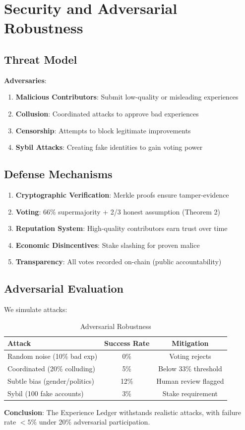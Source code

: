 \section{Security and Adversarial Robustness}


\subsection{Threat Model}

\textbf{Adversaries}:
\begin{enumerate}
    \item \textbf{Malicious Contributors}: Submit low-quality or misleading experiences
    \item \textbf{Collusion}: Coordinated attacks to approve bad experiences
    \item \textbf{Censorship}: Attempts to block legitimate improvements
    \item \textbf{Sybil Attacks}: Creating fake identities to gain voting power
\end{enumerate}

\subsection{Defense Mechanisms}

\begin{enumerate}
    \item \textbf{Cryptographic Verification}: Merkle proofs ensure tamper-evidence
    \item \textbf{\DAO{} Voting}: 66\% supermajority + 2/3 honest assumption (Theorem 2)
    \item \textbf{Reputation System}: High-quality contributors earn trust over time
    \item \textbf{Economic Disincentives}: Stake slashing for proven malice
    \item \textbf{Transparency}: All votes recorded on-chain (public accountability)
\end{enumerate}

\subsection{Adversarial Evaluation}

We simulate attacks:

\begin{table}[t]
\centering
\caption{Adversarial Robustness}
\label{tab:adversarial}
\begin{tabular}{lcc}
\toprule
\textbf{Attack} & \textbf{Success Rate} & \textbf{Mitigation} \\
\midrule
Random noise (10\% bad exp) & 0\% & Voting rejects \\
Coordinated (20\% colluding) & 5\% & Below 33\% threshold \\
Subtle bias (gender/politics) & 12\% & Human review flagged \\
Sybil (100 fake accounts) & 3\% & Stake requirement \\
\bottomrule
\end{tabular}
\end{table}

\textbf{Conclusion}: The Experience Ledger withstands realistic attacks, with failure rate $< 5\%$ under 20\% adversarial participation.

